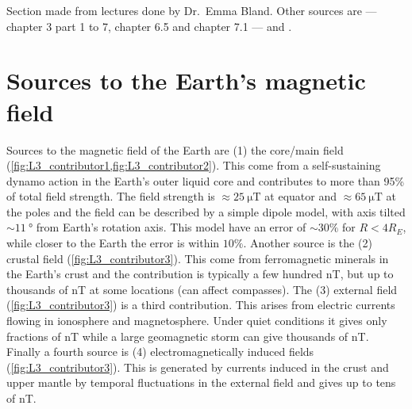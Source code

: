 \begin{remark}
    Section made from lectures done by Dr.\ Emma Bland. Other sources are \citet{BrekkeAsgeir2013Potu} --- chapter 3 part 1 to 7, chapter 6.5 and chapter 7.1 --- and \citet{TwymanR.M.GEAS}.
\end{remark}

\section{Sources to the Earth's magnetic field}
Sources to the magnetic field of the Earth are (1) the core/main field (\cref{fig:L3_contributor1,fig:L3_contributor2}). This come from a self-sustaining dynamo action in the Earth's outer liquid core and contributes to more than 95\% of total field strength. The field strength is \(\approx\SI{25}{\micro\tesla}\) at equator and \(\approx\SI{65}{\micro\tesla}\) at the poles and the field can be described by a simple dipole model, with axis tilted \(\sim\SI{11}{\degree}\) from Earth’s rotation axis. This model have an error of \(\sim 30\% \) for \(R<4R_E\), while closer to the Earth the error is within \(10\% \). Another source is the (2) crustal field (\cref{fig:L3_contributor3}). This come from ferromagnetic minerals in the Earth’s crust and the contribution is typically a few hundred \si{\nano\tesla}, but up to thousands of \si{\nano\tesla} at some locations (can affect compasses). The (3) external field (\cref{fig:L3_contributor3}) is a third contribution. This arises from electric currents flowing in ionosphere and magnetosphere. Under quiet conditions it gives only fractions of \si{\nano\tesla} while a large geomagnetic storm can give thousands of \si{\nano\tesla}. Finally a fourth source is (4) electromagnetically induced fields (\cref{fig:L3_contributor3}). This is generated by currents induced in the crust and upper mantle by temporal fluctuations in the external field and gives up to tens of \si{\nano\tesla}.

